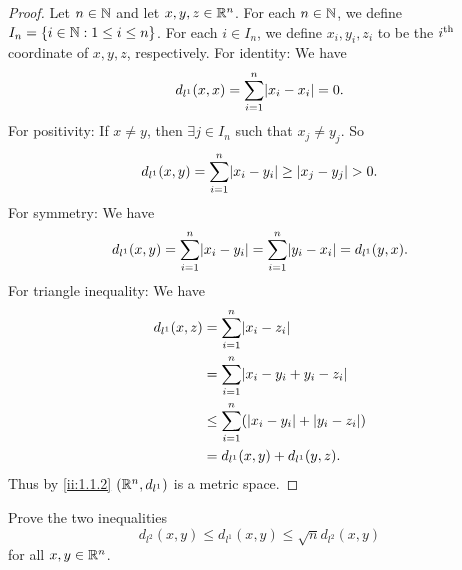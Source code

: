 \begin{proof}
  Let \(n \in \mathbb{N}\) and let \(x, y, z \in \mathbb{R}^n\).
  For each \(n \in \mathbb{N}\), we define \(I_n = \left\lbrace i \in \mathbb{N} : 1 \leq i \leq n\right\rbrace\).
  For each \(i \in I_n\), we define \(x_i, y_i, z_i\) to be the \(i^{\operatorname{th}}\) coordinate of \(x, y, z\), respectively.
  For identity:
  We have
  \[
    d_{l^1}(x, x) = \sum_{i = 1}^n \abs{x_i - x_i} = 0.
  \]
  For positivity:
  If \(x \neq y\), then \(\exists j \in I_n\) such that \(x_j \neq y_j\).
  So
  \[
    d_{l^1}(x, y) = \sum_{i = 1}^n \abs{x_i - y_i} \geq \abs{x_j - y_j} > 0.
  \]
  For symmetry:
  We have
  \[
    d_{l^1}(x, y) = \sum_{i = 1}^n \abs{x_i - y_i} = \sum_{i = 1}^n \abs{y_i - x_i} = d_{l^1}(y, x).
  \]
  For triangle inequality:
  We have
  \begin{align*}
    d_{l^1}(x, z) & = \sum_{i = 1}^n \abs{x_i - z_i}                        \\
                  & = \sum_{i = 1}^n \abs{x_i - y_i + y_i - z_i}            \\
                  & \leq \sum_{i = 1}^n (\abs{x_i - y_i} + \abs{y_i - z_i}) \\
                  & = d_{l^1}(x, y) + d_{l^1}(y, z).
  \end{align*}
  Thus by \cref{ii:1.1.2} \((\mathbb{R}^n, d_{l^1})\) is a metric space.
\end{proof}

\begin{ex}\label{ii:ex:1.1.8}
  Prove the two inequalities
  \[
    d_{l^2}(x, y) \leq d_{l^1}(x, y) \leq \sqrt{n} d_{l^2}(x, y)
  \]
  for all \(x, y \in \mathbb{R}^n\).
\end{ex}

